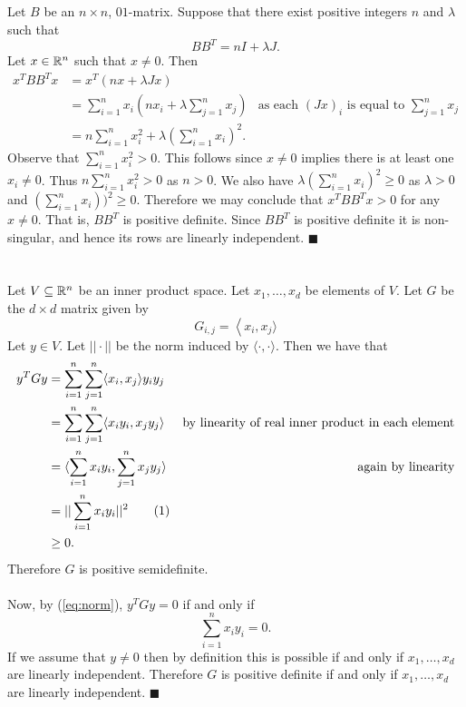 \documentclass[letterpaper,12pt,oneside,onecolumn]{article}
\newcommand\numberthis{\addtocounter{equation}{1}\tag{\theequation}}
\begin{document}
\subsection{}
\paragraph{}
Let $B$ be an $n \times n$, $01$-matrix. Suppose that there exist positive integers $n$ and $\lambda$ such that
$$BB^T = nI + \lambda J.$$
Let $x \in \mathbb{R}^n$ such that $x\neq 0$. Then 
\begin{align*}
x^T BB^T x &= x^T(nx + \lambda Jx) \\
&=\sum_{i=1}^n x_i(nx_i + \lambda \sum_{j=1}^n x_j) &\text{as each $(Jx)_i$ is equal to $\sum_{j=1}^n x_j$} \\
&= n\sum_{i=1}^n x_i^2 + \lambda (\sum_{i=1}^n x_i)^2.
\end{align*}
Observe that $\sum_{i=1}^n x_i^2 > 0$. This follows since $x \neq 0$ implies there is at least one $x_i \neq 0$. Thus $n \sum_{i=1}^n x_i^2 >0$ as $n >0$. We also have $\lambda (\sum_{i=1}^n x_i)^2 \geq 0$ as $\lambda >0$ and $(\sum_{i=1}^n x_i))^2 \geq 0$. Therefore we may conclude that $x^TBB^Tx >0$ for any $x \neq 0$. That is, $BB^T$ is positive definite. Since $BB^T$ is positive definite it is non-singular, and hence its rows are linearly independent. $\blacksquare$

\section{}
\paragraph{}
Let $V \subseteq \mathbb{R}^n$ be an inner product space. Let $x_1, \dots, x_d$ be elements of $V$. Let $G$ be the $d \times d$ matrix given by $$ G_{i,j} = \left \langle x_i, x_j \rangle \right.$$ Let $y \in V$. Let $||\cdot ||$ be the norm induced by $\langle \cdot,\cdot \rangle$. Then we have that
\begin{align*}
y^TGy &= \sum_{i=1}^n\sum_{j=1}^n \langle x_i,x_j \rangle y_i y_j \\
&= \sum_{i=1}^n \sum_{j = 1}^n  \langle x_i y_i, x_j y_j \rangle  &\text{by linearity of real inner product in each element} \\
&= \langle \sum_{i=1}^n x_i y_i, \sum_{j=1}^n x_j y_j \rangle &\text{again by linearity} \\
&= ||\sum_{i=1}^n x_i y_i ||^2 \numberthis\label{eq:norm}\\
&\geq 0.
\end{align*}
Therefore $G$ is positive semidefinite.
\paragraph{}
Now, by (\ref{eq:norm}), $y^TGy = 0$ if and only if
$$\sum_{i=1}^n x_i y_i = 0.$$
If we assume that $y \neq 0$ then by definition this is possible if and only if $x_1, \dots, x_d$ are linearly independent. Therefore $G$ is positive definite if and only if $x_1, \dots, x_d$ are linearly independent. $\blacksquare$
\end{document}
